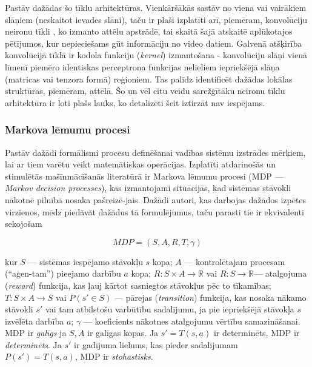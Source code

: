 \documentclass[12pt, a4paper]{article}
\numberwithin{equation}{section} %
\begin{document}
Pastāv dažādas šo tīklu arhitektūras. Vienkāršākās sastāv no viena vai vairākiem slāņiem (neskaitot ievades slāni), taču ir plaši izplatīti arī, piemēram, konvolūciju neironu tīkli \cite{krizhevsky2012imagenet}, ko izmanto attēlu apstrādē, tai skaitā šajā atskaitē aplūkotajos pētījumos, kur nepieciešams gūt informāciju no video datiem. Galvenā atšķirība konvolūcijā tīklā ir kodola funkciju (\textit{kernel}) izmantošana - konvolūciju slāņi vienā līmenī piemēro identiskas perceptrona funkcijas nelieliem iepriekšējā slāņa (matricas vai tenzora formā) reģioniem. Tas palīdz identificēt dažādas lokālas struktūras, piemēram, attēlā. Šo un vēl citu veidu sarežģītāku neironu tīklu arhitektūra ir ļoti plašs lauks, ko detalizēti šeit iztirzāt nav iespējams.

\subsubsection{Markova lēmumu procesi}

Pastāv dažādi formālismi procesu definēšanai vadības sistēmu izstrādes mērķiem, lai ar tiem varētu veikt matemātiskas operācijas. Izplatīti atdarinošās un stimulētās mašīnmācīšanās literatūrā ir Markova lēmumu procesi (MDP --- \textit{Markov decision processes}), kas izmantojami situācijās, kad sistēmas stāvokli nākotnē pilnībā nosaka pašreizē-jais. Dažādi autori, kas darbojas dažādos izpētes virzienos, mēdz piedāvāt dažādus tā formulējumus, taču parasti tie ir ekvivalenti sekojošam \cite{attia2018global}

\begin{equation} 
    MDP = (S,A,R,T, \gamma)
\end{equation}

kur $S$ --- sistēmas iespējamo stāvokļu $s$ kopa; $A$ --- kontrolētajam procesam (``aģen-tam'') pieejamo darbību $a$ kopa; $R: S \times A \rightarrow \mathbb{R}$ vai $R: S \rightarrow \mathbb{R}$--- atalgojuma (\textit{reward}) funkcija, kas ļauj kārtot sasniegtos stāvokļus pēc to tīkamības; $T: S \times A \rightarrow S$ vai $P(s' \in S)$ --- pārejas (\textit{transition}) funkcija, kas nosaka nākamo stāvokli $s'$ vai tam atbilstošu varbūtību sadalījumu, ja pie iepriekšējā stāvokļa $s$ izvēlēta darbība $a$; $\gamma$ --- koeficients nākotnes atalgojumu vērtību samazināšanai. MDP ir \textit{galīgs} ja $S,A$ ir galīgas kopas. Ja $s' = T(s,a)$ ir determinēts, MDP ir \textit{determinēts}. Ja $s'$ ir gadījuma lielums, kas pieder sadalījumam $P(s')=T(s,a)$, MDP ir \textit{stohastisks}.
\end{document}
